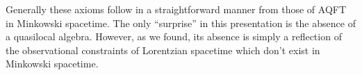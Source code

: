 
Generally these axioms follow in a straightforward manner from those of AQFT in Minkowski spacetime. The only ``surprise'' in this presentation is the absence of a quasilocal algebra. However, as we found, its absence is simply a reflection of the observational constraints of Lorentzian spacetime which don't exist in Minkowski spacetime.
